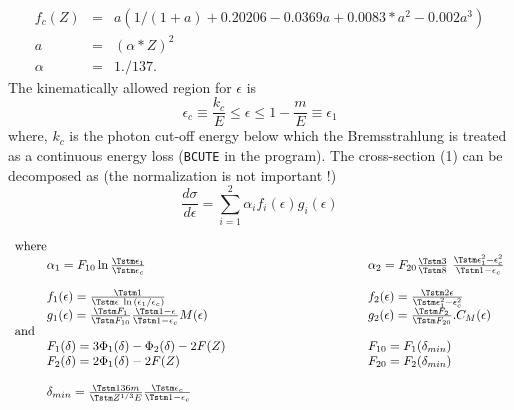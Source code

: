\begin{bibunit}[unsrt]
\begin{eqnarray*}
f_c(Z) & = & a(1/(1+a)+0.20206-0.0369a+0.0083*a^2-0.002a^3)\\
    a   & = & (\alpha*Z)^2                                     \\
\alpha  & = & 1./137.
\end{eqnarray*}
 The kinematically allowed region for $\epsilon$ is
\begin{equation}
\epsilon_c \equiv \frac{k_c}{E} \leq \epsilon \leq  1- \frac{m}{E} 
\equiv \epsilon_1
\end{equation}
where,  $k_c$ is the photon cut-off energy below which the Bremsstrahlung
is treated as a continuous energy loss ({\tt BCUTE} in the program).
The cross-section (1) can be decomposed as
(the normalization is not important !)
\begin{equation}
\frac{d \sigma}{d \epsilon} =  \sum^{2}_{i=1} \alpha_i f_i(\epsilon)
      g_i(\epsilon )
\end{equation}
\begin{flushleft}
$\begin{array}{l@{}l@{\hspace{4cm}}l}
\mbox{where} & & \\
& \alpha_1 = F_{10}\ln \frac{\Tstm \epsilon_1}{\Tstm \epsilon_c}&
  \alpha_2 = F_{20}\frac{\Tstm 3}{\Tstm 8}\
             \frac{\Tstm \epsilon_1^2 -\epsilon_c^2}{\Tstm 1-\epsilon_c}\\
& & \\
& f_1 (\epsilon) = \frac{\Tstm 1}
                 {\Tstm \epsilon \; \ln {(\epsilon_1/ \epsilon_c)}} &
  f_2(\epsilon) = \frac{\Tstm 2 \epsilon}{\Tstm \epsilon_1^2 -\epsilon_c^2}\\
& g_1(\epsilon)=\frac{\Tstm F_1}{\Tstm F_{10}}
                \frac{\Tstm 1-\epsilon}{\Tstm 1-\epsilon_c} M(\epsilon)&
g_2(\epsilon )  = \frac{\Tstm F_2}{\Tstm F_{20}} . C_M (\epsilon )\\
\mbox{and} & & \\
& F_1(\delta) = 3\Phi_1(\delta)-\Phi_2(\delta)-2F(Z)  &
  F_{10}=F_1(\delta_{min})                     \\
& F_2(\delta) = 2\Phi_1(\delta)-2F(Z)                 &
  F_{20} = F_2(\delta_{min})                   \\
\\
& \delta_{min} = \frac{\Tstm 136m}{\Tstm Z^{1/3}E}
                \frac{\Tstm \epsilon_c}{\Tstm 1- \epsilon_c}
\end{array}$

\end{flushleft}
\end{bibunit}
